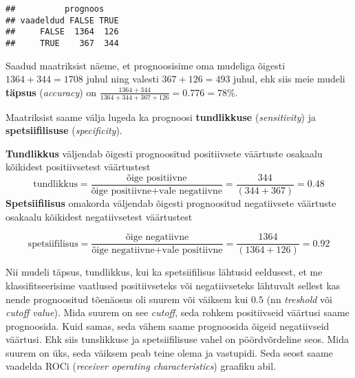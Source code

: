 \documentclass[
]{book}
\newenvironment{Shaded}{\begin{snugshade}}{\end{snugshade}}
\newcommand{\AttributeTok}[1]{\textcolor[rgb]{0.77,0.63,0.00}{#1}}
\newcommand{\CommentTok}[1]{\textcolor[rgb]{0.56,0.35,0.01}{\textit{#1}}}
\newcommand{\FloatTok}[1]{\textcolor[rgb]{0.00,0.00,0.81}{#1}}
\newcommand{\FunctionTok}[1]{\textcolor[rgb]{0.00,0.00,0.00}{#1}}
\newcommand{\NormalTok}[1]{#1}
\newcommand{\OtherTok}[1]{\textcolor[rgb]{0.56,0.35,0.01}{#1}}
\newcommand{\SpecialCharTok}[1]{\textcolor[rgb]{0.00,0.00,0.00}{#1}}
\newcommand{\StringTok}[1]{\textcolor[rgb]{0.31,0.60,0.02}{#1}}
\begin{document}
\begin{Shaded}
\end{Shaded}

\begin{verbatim}
##          prognoos
## vaadeldud FALSE TRUE
##     FALSE  1364  126
##     TRUE    367  344
\end{verbatim}

Saadud maatriksist näeme, et prognoosisime oma mudeliga õigesti \(1364 + 344 = 1708\) juhul ning valesti \(367+126 = 493\) juhul, ehk siis meie mudeli \textbf{täpsus} (\emph{accuracy}) on \(\frac{1364 + 344}{1364 + 344 + 367+126} = 0.776 = 78\%\).

Maatriksist saame välja lugeda ka prognoosi \textbf{tundlikkuse} (\emph{sensitivity}) ja \textbf{spetsiifilisuse} (\emph{specificity}).

\textbf{Tundlikkus} väljendab õigesti prognoositud positiivsete väärtuste osakaalu kõikidest positiivsetest väärtustest
\[\text{tundlikkus} = \frac{\text{õige positiivne}}{\text{õige positiivne} + \text{vale negatiivne}} = \frac{344}{(344+367)} = 0.48\]
\textbf{Spetsiifilisus} omakorda väljendab õigesti prognoositud negatiivsete väärtuste osakaalu kõikidest negatiivsetest väärtustest

\[\text{spetsiifilisus} = \frac{\text{õige negatiivne}}{\text{õige negatiivne} + \text{vale positiivne}} = \frac{1364}{(1364+126)} = 0.92\]

Nii mudeli täpsus, tundlikkus, kui ka spetsiifilisus lähtusid eeldusest, et me klassifitseerisime vaatlused positiivseteks või negatiivseteks lähtuvalt sellest kas nende prognoositud tõenäosus oli suurem või väiksem kui \(0.5\) (nn \emph{treshold} või \emph{cutoff value}). Mida suurem on see \emph{cutoff}, seda rohkem positiivseid väärtusi saame prognoosida. Kuid samas, seda vähem saame prognoosida õigeid negatiivseid väärtusi. Ehk siis tunslikkuse ja spetsiifilisuse vahel on pöördvõrdeline seos. Mida suurem on üks, seda väiksem peab teine olema ja vastupidi. Seda seost saame vaadelda ROCi (\emph{receiver operating characteristics}) graafiku abil.
\end{document}
